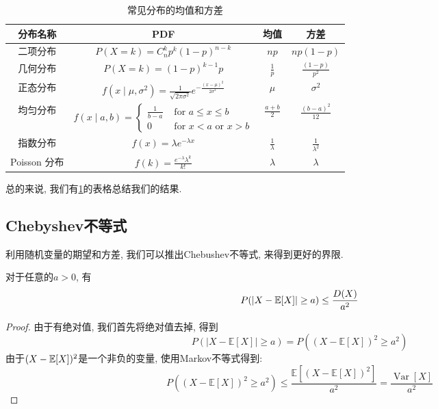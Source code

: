 \begin{table}
    \begin{tabular}{|c|c|c|c|}
        \hline 分布名称 & PDF & 均值 & 方差 \\
        \hline 二项分布 & $P(X=k)=C_n^kp^k(1-p)^{n-k}$ & $n p$ & $n p(1-p)$ \\
        \hline 几何分布 & $P(X=k)=(1-p)^{k-1} p$ & $\frac{1}{p}$ & $\frac{(1-p)}{p^2}$ \\
        \hline 正态分布 & $f\left(x \mid \mu, \sigma^2\right)=\frac{1}{\sqrt{2 \pi \sigma^2}} e^{-\frac{(x-\mu)^2}{2 \sigma^2}}$ & $\mu$ & $\sigma^2$ \\
        \hline 均匀分布 & $f(x \mid a, b)= \begin{cases}\frac{1}{b-a} & \text { for } a \leq x \leq b \\
            0 & \text { for } x<a \text { or } x>b\end{cases}$ & $\frac{a+b}{2}$ & $\frac{(b-a)^2}{12}$ \\
            \hline 指数分布 & $f(x )=\lambda e^{-\lambda x}$ & $\frac{1}{\lambda}$ & $\frac{1}{\lambda^2}$ \\
            \hline Poisson 分布 & $f(k )=\frac{e^{-\lambda} \lambda^k}{k !}$ & $\lambda$ & $\lambda$ \\
            \hline
        \end{tabular}
        \caption{常见分布的均值和方差}
        \label{table:mean-var}
\end{table}
总的来说, 我们有\cref{table:mean-var}的表格总结我们的结果. 


\subsection{Chebyshev不等式}

利用随机变量的期望和方差, 我们可以推出Chebushev不等式, 来得到更好的界限. 

\begin{theorem}
    对于任意的$a>0$, 有
    $$
    P(|X-\mathbb E[X]|\geq a)\leq \frac{D(X)}{a^2}
    $$
\end{theorem}

\begin{proof}
    由于有绝对值, 我们首先将绝对值去掉, 得到
    $$
P(|X-\mathbb{E}[X]| \geq a)=P\left((X-\mathbb{E}[X])^2 \geq a^2\right)
$$
由于$(X-\mathbb E[X])^2$是一个非负的变量, 使用Markov不等式得到: 
$$P\left((X-\mathbb{E}[X])^2 \geq a^2\right) \leq \frac{\mathbb{E}\left[(X-\mathbb{E}[X])^2\right]}{a^2}=\frac{\operatorname{Var}[X]}{a^2}$$


\end{proof}

